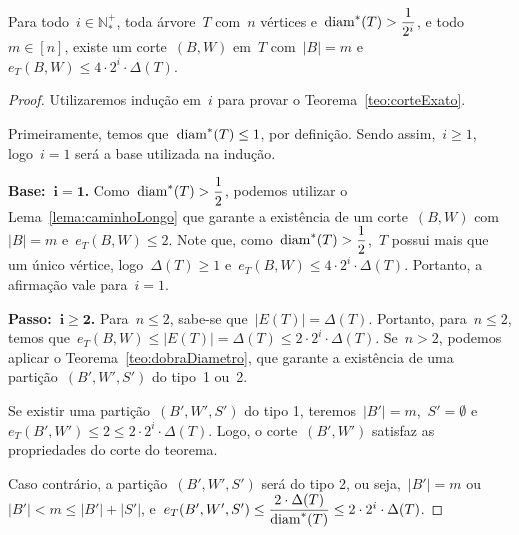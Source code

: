 	\begin{teo}
	\label{teo:corteExato}
		Para todo~${i\in \mathbb{N^+_*}}$, toda árvore~$T$ com~$n$
		vértices e~${\mathrm{diam}^*(T)>\dfrac{1}{2^i}}$, e todo~${m\in[n]}$,
		existe um corte~$(B,W)$ em~$T$ com~$|B|=m$ 
		e~$e_T(B,W)\le 4\cdot 2^i\cdot \Delta(T)$.
	\end{teo}

	\medskip
	\medskip

	\begin{proof}
		Utilizaremos indução em~$i$ para provar o Teorema~\ref{teo:corteExato}.
		
		Primeiramente, temos que~${\mathrm{diam}^*(T)\le1}$, por definição. 
		Sendo assim,~${i\ge1}$, logo~${i=1}$ será a base 
		utilizada na indução.
		
		\textbf{Base:~${\mathbf {i=1}}$.}
		Como~${\mathrm{diam}^*(T)>\dfrac{1}{2}}$,
		podemos utilizar o Lema~\ref{lema:caminhoLongo} que
		garante a existência de 
		um corte~$(B,W)$ 
		com~${|B|=m}$ e~${e_T(B,W)\le 2}$.
		Note que, como~${\mathrm{diam}^*(T)>\dfrac{1}{2}}$,~$T$
		possui mais que um único vértice, logo~${\Delta(T)\ge 1}$
		e~${e_T(B,W)\le 4\cdot 2^i\cdot \Delta(T)}$.
		Portanto, a afirmação vale para~${i=1}$.


		\textbf{Passo:~${\mathbf{i\ge 2}}$.} 
		Para~${n\le 2}$, sabe-se que~${|E(T)|=\Delta(T)}$. 
		Portanto, para~${n\le 2}$, temos 
		que~${e_T(B,W)\le |E(T)|=\Delta(T)\le 2\cdot 2^i\cdot 
		\Delta(T)}$.
		Se~${n>2}$, podemos aplicar o
		Teorema~\ref{teo:dobraDiametro}, que garante a existência 
		de uma partição~$(B',W',S')$ do tipo~1 ou~2.

			Se existir uma partição~$(B',W',S')$ do tipo 1, 
			teremos~${|B'|=m}$,~${S'=\emptyset}$
			e~${e_T(B',W')\le2\le 2\cdot 2^i\cdot \Delta(T)}$.
			Logo, o corte~$(B',W')$ satisfaz as propriedades
			do corte do teorema.

			Caso contrário, a partição~$(B',W',S')$ será do tipo 2, ou 
			seja,~${|B'|=m}$ ou~${|B'|<m\le |B'|+|S'|}$, 
			e~${e_T(B',W',S')\le \dfrac{2\cdot\Delta(T)}{\mathrm{diam}^*(T)}\le
			2\cdot2^i\cdot\Delta(T)}$.
			

\end{proof}
